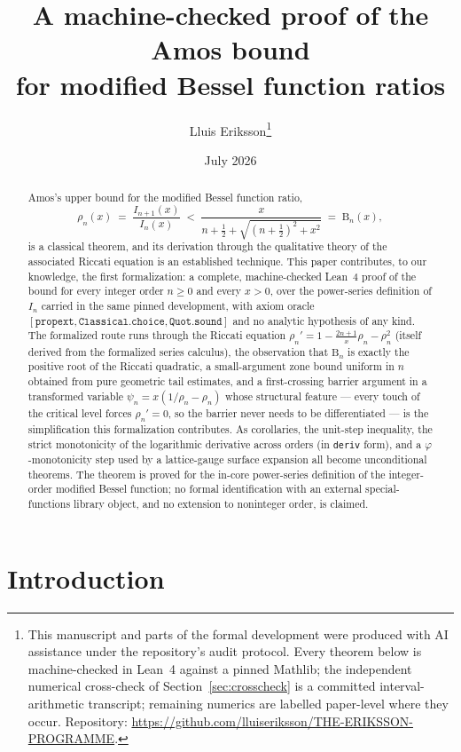 \documentclass[11pt]{article}
\title{A machine-checked proof of the Amos bound\\
for modified Bessel function ratios}
\author{Lluis Eriksson\thanks{This manuscript and parts of the formal
development were produced with AI assistance under the repository's
audit protocol.  Every theorem below is machine-checked in Lean~4
against a pinned Mathlib; the independent numerical cross-check of
Section~\ref{sec:crosscheck} is a committed interval-arithmetic
transcript; remaining numerics are labelled paper-level where they
occur.  Repository:
\url{https://github.com/lluiseriksson/THE-ERIKSSON-PROGRAMME}.}}
\date{July 2026}
\newcommand{\lean}[1]{\texttt{#1}}
\newcommand{\RHS}{\mathrm{B}}
\begin{document}
\maketitle

\begin{abstract}
Amos's upper bound for the modified Bessel function ratio,
\[
\rho_n(x) \;=\; \frac{I_{n+1}(x)}{I_n(x)}
\;<\;
\frac{x}{n+\tfrac12+\sqrt{(n+\tfrac12)^2+x^2}} \;=\; \RHS_n(x),
\]
is a classical theorem, and its derivation through the qualitative
theory of the associated Riccati equation is an established
technique.  This paper contributes, to our knowledge, the first
formalization: a complete, machine-checked Lean~4 proof of the bound
for every integer order $n \ge 0$ and every $x > 0$, over the
power-series definition of $I_n$ carried in the same pinned
development, with axiom oracle
$[\lean{propext}, \lean{Classical.choice}, \lean{Quot.sound}]$ and
no analytic hypothesis of any kind.  The formalized route runs
through the Riccati equation $\rho_n' = 1 - \frac{2n+1}{x}\rho_n -
\rho_n^2$ (itself derived from the formalized series calculus), the
observation that $\RHS_n$ is exactly the positive root of the
Riccati quadratic, a small-argument zone bound
uniform in $n$ obtained from pure geometric tail estimates, and a
first-crossing barrier argument in a transformed variable
$\psi_n = x(1/\rho_n - \rho_n)$ whose structural feature --- every
touch of the critical level forces $\rho_n' = 0$, so the barrier
never needs to be differentiated --- is the simplification this
formalization contributes.  As corollaries, the unit-step
inequality, the strict monotonicity of the logarithmic derivative
across orders (in \lean{deriv} form), and a $\varphi$-monotonicity
step used by a lattice-gauge surface expansion all become
unconditional theorems.  The theorem is proved for the in-core
power-series definition of the integer-order modified Bessel
function; no formal identification with an external
special-functions library object, and no extension to noninteger
order, is claimed.
\end{abstract}

\section{Introduction}
\end{document}

